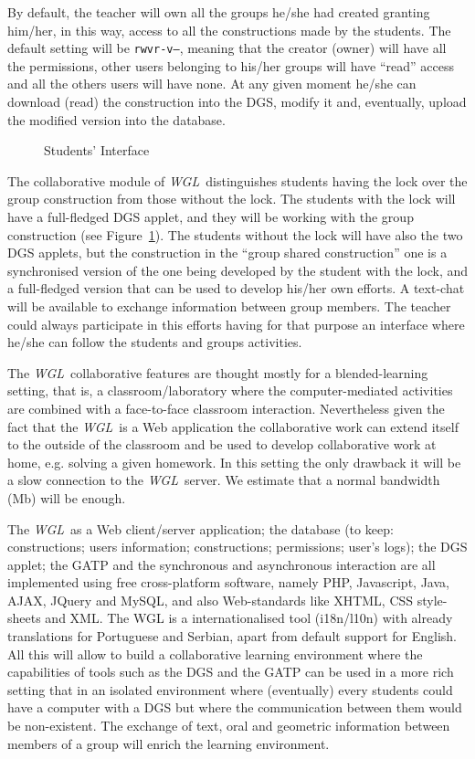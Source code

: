 \documentclass{llncs}
\newcommand{\WGL}{{\em WGL}}
\begin{document}
By default, the teacher will own all the groups he/she had created
granting him/her, in this way, access to all the constructions made by
the students. The default setting will be {\tt rwvr-v---}, meaning
that the creator (owner) will have all the permissions, other users
belonging to his/her groups will have ``read'' access and all the
others users will have none. At any given moment he/she can download
(read) the construction into the DGS, modify it and, eventually,
upload the modified version into the database.

\begin{figure}[hbtp]  
  \caption{Students' Interface}
  \label{fig:withlock}
\end{figure}

The collaborative module of \WGL\ distinguishes students having the
lock over the group construction from those without the lock. The
students with the lock will have a full-fledged DGS applet, and they
will be working with the group construction (see
Figure~\ref{fig:withlock}). The students without the lock will have
also the two DGS applets, but the construction in the ``group shared
construction'' one is a synchronised version of the one being
developed by the student with the lock, and a full-fledged version
that can be used to develop his/her own efforts. A text-chat will be
available to exchange information between group members. The teacher
could always participate in this efforts having for that purpose an
interface where he/she can follow the students and groups activities.

The \WGL\ collaborative features are thought mostly for a
blended-learning setting, that is, a classroom/laboratory where the
computer-mediated activities are combined with a face-to-face
classroom interaction. Nevertheless given the fact that the \WGL\ is a
Web application the collaborative work can extend itself to the
outside of the classroom and be used to develop collaborative work at
home, e.g. solving a given homework. In this setting the only drawback
it will be a slow connection to the \WGL\ server. We estimate that a
normal bandwidth (Mb) will be enough.

The \WGL\ as a Web client/server application; the database (to keep:
constructions; users information; constructions; permissions; user's
logs); the DGS applet; the GATP and the synchronous and asynchronous
interaction are all implemented using free cross-platform software,
namely PHP, Javascript, Java, AJAX, JQuery and MySQL, and also
Web-standards like XHTML, CSS style-sheets and XML. The WGL is a
internationalised tool (i18n/l10n) with already translations for
Portuguese and Serbian, apart from default support for English. All
this will allow to build a collaborative learning environment where
the capabilities of tools such as the DGS and the GATP can be used in
a more rich setting that in an isolated environment where (eventually)
every students could have a computer with a DGS but where the
communication between them would be non-existent. The exchange of
text, oral and geometric information between members of a group will
enrich the learning environment.
\end{document}
